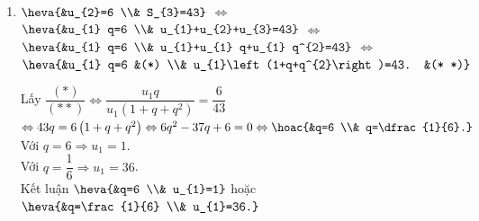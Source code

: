 \begin{bt}
{\begin{enumerate}
			Lấy $\dfrac{(* *)}{(*)} \Leftrightarrow \dfrac{u_{1} q^{3}\left(1+q+q^{2}\right)}{u_{1}\left(1+q+q^{2}\right)}=\dfrac{40}{135} \Leftrightarrow q^{3}=\dfrac{8}{27} 
			\Leftrightarrow q=\dfrac{2}{3}$\\
			$\Rightarrow u_{1}=\dfrac{135}{1+q+q^{2}}=\dfrac{1215}{19}$.\\
			Kết luận có công bội $q=\dfrac{2}{3}$ và số hạng đầu tiên $u_{1}=\dfrac{1215}{19}$.
			\item $ \heva{&u_{2}=6 \\& S_{3}=43} $ $ \Leftrightarrow $
			$ \heva{&u_{1} q=6 \\& u_{1}+u_{2}+u_{3}=43} $ $ \Leftrightarrow $
			$ \heva{&u_{1} q=6 \\& u_{1}+u_{1} q+u_{1} q^{2}=43} $ $ \Leftrightarrow $
			$ \heva{&u_{1} q=6 &(*) \\& u_{1}\left(1+q+q^{2}\right)=43. &(* *)} $
			
			Lấy $\dfrac{(*)}{(* *)} \Leftrightarrow \dfrac{u_{1} q}{u_{1}\left(1+q+q^{2}\right)}=\dfrac{6}{43}$
			$\Leftrightarrow 43 q=6\left(1+q+q^{2}\right) \Leftrightarrow 6 q^{2}-37 q+6=0 \Leftrightarrow \hoac{&q=6 \\& q=\dfrac{1}{6}.}$\\
			Với $q=6 \Rightarrow u_{1}=1$.\\
			Với $q=\dfrac{1}{6} \Rightarrow u_{1}=36$.\\
			Kết luận $\heva{&q=6 \\& u_{1}=1}$ hoặc $\heva{&q=\frac{1}{6} \\& u_{1}=36.}$
			
		\end{enumerate}
	}
\end{bt}

